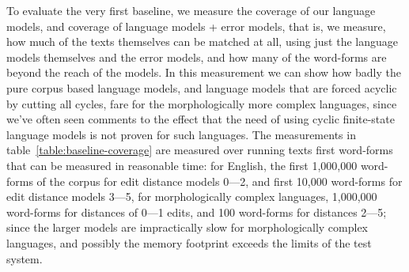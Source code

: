 \documentclass[a4paper,12pt]{article}
\begin{document}
To evaluate the very first baseline, we measure the coverage of our language
models, and coverage of language models + error models, that is, we measure,
how much of the texts themselves can be matched at all, using just the language
models themselves and the error models, and how many of the word-forms are
beyond the reach of the models. In this measurement we can show how badly the
pure corpus based language models, and language models that are forced acyclic
by cutting all cycles, fare for the morphologically more complex languages,
since we've often seen comments to the effect that the need of using cyclic
finite-state language models is not proven for such languages. The measurements
in table~\ref{table:baseline-coverage} are measured over running texts first
word-forms that can be measured in reasonable time: for English, the first
1,000,000 word-forms of the corpus for edit distance models 0---2, and first
10,000 word-forms for edit distance models 3---5, for morphologically complex
languages, 1,000,000 word-forms for distances of 0---1 edits, and 100
word-forms for distances 2---5; since the larger models are impractically slow
for morphologically complex languages, and possibly the memory footprint
exceeds the limits of the test system.
\end{document}
